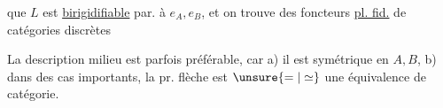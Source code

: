   que $L$ est \uline{birigidifiable} par. à $e_A,e_B$, et on trouve des foncteurs \uline{pl. fid.} de catégories discrètes

La description   milieu est parfois préférable, car a) il est  symétrique en $A,B$, b) dans des cas importants, la pr. flèche est $\unsure{=|\simeq}$ une équivalence de catégorie.

